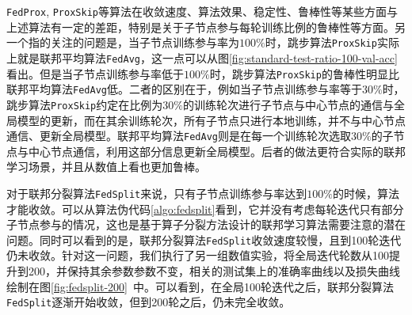 \texttt{FedProx}, \texttt{ProxSkip}等算法在收敛速度、算法效果、稳定性、鲁棒性等某些方面与上述算法有一定的差距，特别是关于子节点参与每轮训练比例的鲁棒性等方面。另一个指的关注的问题是，当子节点训练参与率为$100\%$时，跳步算法\texttt{ProxSkip}实际上就是联邦平均算法\texttt{FedAvg}，这一点可以从图\ref{fig:standard-test-ratio-100-val-acc}看出。但是当子节点训练参与率低于$100\%$时，跳步算法\texttt{ProxSkip}的鲁棒性明显比联邦平均算法\texttt{FedAvg}低。二者的区别在于，例如当子节点训练参与率等于$30\%$时，跳步算法\texttt{ProxSkip}约定在比例为$30\%$的训练轮次进行子节点与中心节点的通信与全局模型的更新，而在其余训练轮次，所有子节点只进行本地训练，并不与中心节点通信、更新全局模型。联邦平均算法\texttt{FedAvg}则是在每一个训练轮次选取$30\%$的子节点与中心节点通信，利用这部分信息更新全局模型。后者的做法更符合实际的联邦学习场景，并且从数值上看也更加鲁棒。

对于联邦分裂算法\texttt{FedSplit}来说，只有子节点训练参与率达到$100\%$的时候，算法才能收敛。可以从算法伪代码\ref{algo:fedsplit}看到，它并没有考虑每轮迭代只有部分子节点参与的情况，这也是基于算子分裂方法设计的联邦学习算法需要注意的潜在问题。同时可以看到的是，联邦分裂算法\texttt{FedSplit}收敛速度较慢，且到100轮迭代仍未收敛。针对这一问题，我们执行了另一组数值实验，将全局迭代轮数从100提升到200，并保持其余参数参数不变，相关的测试集上的准确率曲线以及损失曲线绘制在图\ref{fig:fedsplit-200}~中。可以看到，在全局100轮迭代之后，联邦分裂算法\texttt{FedSplit}逐渐开始收敛，但到200轮之后，仍未完全收敛。

